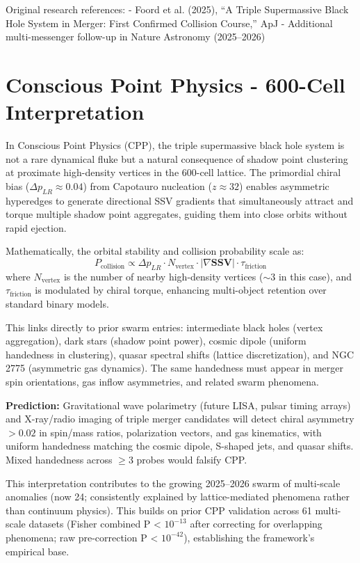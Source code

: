 \documentclass[11pt]{article}
\begin{document}
Original research references:  
- Foord et al. (2025), ``A Triple Supermassive Black Hole System in Merger: First Confirmed Collision Course,'' ApJ  
- Additional multi-messenger follow-up in Nature Astronomy (2025--2026)

\section{Conscious Point Physics - 600-Cell Interpretation}
In Conscious Point Physics (CPP), the triple supermassive black hole system is not a rare dynamical fluke but a natural consequence of shadow point clustering at proximate high-density vertices in the 600-cell lattice. The primordial chiral bias ($\Delta p_{LR} \approx 0.04$) from Capotauro nucleation ($z \approx 32$) enables asymmetric hyperedges to generate directional SSV gradients that simultaneously attract and torque multiple shadow point aggregates, guiding them into close orbits without rapid ejection.

Mathematically, the orbital stability and collision probability scale as:
\[
P_{\text{collision}} \propto \Delta p_{LR} \cdot N_{\text{vertex}} \cdot |\nabla \mathbf{SSV}| \cdot \tau_{\text{friction}}
\]
where $N_{\text{vertex}}$ is the number of nearby high-density vertices ($\sim 3$ in this case), and $\tau_{\text{friction}}$ is modulated by chiral torque, enhancing multi-object retention over standard binary models.

This links directly to prior swarm entries: intermediate black holes (vertex aggregation), dark stars (shadow point power), cosmic dipole (uniform handedness in clustering), quasar spectral shifts (lattice discretization), and NGC 2775 (asymmetric gas dynamics). The same handedness must appear in merger spin orientations, gas inflow asymmetries, and related swarm phenomena.

\textbf{Prediction:} Gravitational wave polarimetry (future LISA, pulsar timing arrays) and X-ray/radio imaging of triple merger candidates will detect chiral asymmetry $>0.02$ in spin/mass ratios, polarization vectors, and gas kinematics, with uniform handedness matching the cosmic dipole, S-shaped jets, and quasar shifts. Mixed handedness across $\geq 3$ probes would falsify CPP.

This interpretation contributes to the growing 2025--2026 swarm of multi-scale anomalies (now 24; consistently explained by lattice-mediated phenomena rather than continuum physics). This builds on prior CPP validation across 61 multi-scale datasets (Fisher combined P < $10^{-13}$ after correcting for overlapping phenomena; raw pre-correction P < $10^{-42}$), establishing the framework's empirical base.
\end{document}
